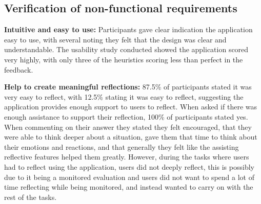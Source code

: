 \documentclass{l4proj}
\begin{document}
    



\subsection{Verification of non-functional requirements}

\textbf{Intuitive and easy to use:} Participants gave clear indication the application easy to use, with several noting they felt that the design was clear and understandable. The usability study conducted showed the application scored very highly, with only three of the heuristics scoring less than perfect in the feedback. 

\textbf{Help to create meaningful reflections:} 87.5\% of participants stated it was very easy to reflect, with 12.5\% stating it was easy to reflect, suggesting the application provides enough support to users to reflect. When asked if there was enough assistance to support their reflection, 100\% of participants stated yes. When commenting on their answer they stated they felt encouraged, that they were able to think deeper about a situation, gave them that time to think about their emotions and reactions, and that generally they felt like the assisting reflective features helped them greatly. However, during the tasks where users had to reflect using the application, users did not deeply reflect, this is possibly due to it being a monitored evaluation and users did not want to spend a lot of time reflecting while being monitored, and instead wanted to carry on with the rest of the tasks.
\end{document}
